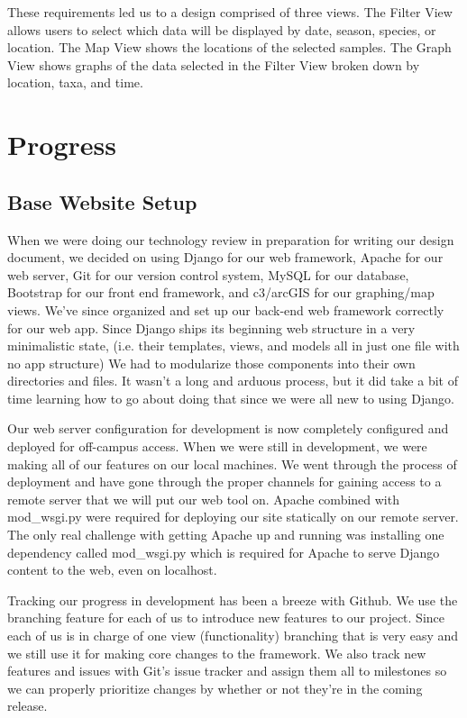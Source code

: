 \documentclass[10pt,draftclsnofoot,onecolumn]{IEEEtran}
\begin{document}
These requirements led us to a design comprised of three views.
The Filter View allows users to select which data will be displayed by date, season, species, or location.
The Map View shows the locations of the selected samples.
The Graph View shows graphs of the data selected in the Filter View broken down by location, taxa, and time.


\section{Progress}

\subsection{Base Website Setup} %
When we were doing our technology review in preparation for writing our design document, we decided on using Django for our web framework, Apache for our web server, Git for our version control system, MySQL for our database, Bootstrap for our front end framework, and c3/arcGIS for our graphing/map views.
We’ve since organized and set up our back-end web framework correctly for our web app.
Since Django ships its beginning web structure in a very minimalistic state, (i.e. their templates, views, and models all in just one file with no app structure) We had to modularize those components into their own directories and files.
It wasn’t a long and arduous process, but it did take a bit of time learning how to go about doing that since we were all new to using Django.

Our web server configuration for development is now completely configured and deployed for off-campus access.
When we were still in development, we were making all of our features on our local machines.
We went through the process of deployment and have gone through the proper channels for gaining access to a remote server that we will put our web tool on.
Apache combined with mod_wsgi.py were required for deploying our site statically on our remote server.
The only real challenge with getting Apache up and running was installing one dependency called mod_wsgi.py which is required for Apache to serve Django content to the web, even on localhost.

Tracking our progress in development has been a breeze with Github.
We use the branching feature for each of us to introduce new features to our project.
Since each of us is in charge of one view (functionality) branching that is very easy and we still use it for making core changes to the framework.
We also track new features and issues with Git’s issue tracker and assign them all to milestones so we can properly prioritize changes by whether or not they’re in the coming release.
\end{document}
